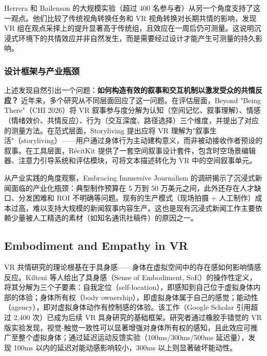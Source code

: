 Herrera 和 Bailenson 的大规模实验（超过 400 名参与者）从另一个角度支持了这一观点。他们比较了传统视角转换任务和 VR 视角转换对长期共情的影响，发现 VR 组在观点采择上的提升显著高于传统组，且效应在一周后仍可测量\cite{herrera2018building}。这说明沉浸式环境下的共情效应并非自然发生，而是需要经过设计才能产生可测量的持久影响。

\subsubsection{设计框架与产业瓶颈}

上述发现自然引出一个问题：\textbf{如何构造有效的叙事和交互机制以激发受众的共情反应？} 近年来，多个研究从不同层面回应了这一问题。在评估层面，Beyond "Being There"（CHI 2026）将 VR 叙事参与度分解为认知（空间记忆、叙事理解）、情感（情绪效价、共情反应）、行为（交互深度、路径选择）三个维度，并提出了对应的测量方法\cite{beyondbeingthere2026}。在范式层面，Storyliving 提出应将 VR 理解为"叙事生活"（storyliving）——用户通过身体行为主动建构意义，而非被动接收作者预设的叙事\cite{storyliving2022}。在工具层面，RécitKit 提供了一套空间叙事设计套件，包含时空场景编辑器、注意力引导系统和评估模块，可将文本描述转化为 VR 中的空间叙事单元\cite{recitkit2025}。

从产业实践的角度观察，Embracing Immersive Journalism 的调研揭示了沉浸式新闻面临的产业化瓶颈：典型制作预算在 5 万到 50 万美元之间，此外还存在人才缺口、分发困难和 ROI 不明确等问题\cite{embracing2024}。现有的生产模式（现场拍摄 + 人工制作）成本过高，难以支持大规模的新闻叙事内容生产。这也是现有沉浸式新闻工作主要依赖少量被人工精选的素材（如知名通讯社稿件）的原因之一。

\subsection{Embodiment and Empathy in VR}

VR 共情研究的理论根基在于具身感——身体在虚拟空间中的存在感如何影响情感反应。Kilteni 等人给出了具身感（Sense of Embodiment, SoE）的操作性定义，将其分解为三个子要素：自我定位（self-location），即感知到自己位于虚拟身体内部的体验；身体所有权（body ownership），即虚拟身体属于自己的感觉；能动性（agency），即对虚拟身体动作有控制感的体验\cite{kilteni2012embodiment}。该工作（Google Scholar 引用超过 2,400 次）已成为后续 VR 具身研究的基础框架。研究者通过橡胶手错觉的 VR 版实验发现，视觉-触觉一致性可以显著增强对身体所有权的感知，且此效应可推广至整个虚拟身体；通过延迟运动反馈实验（100ms/300ms/500ms 延迟量），发现 100ms 以内的延迟对能动感影响较小，300ms 以上则显著破坏能动性。

